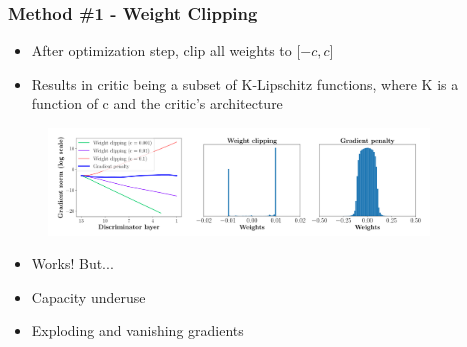 \documentclass{Bredelebeamer}
\begin{document}
\begin{frame}
	\frametitle{Method \#1 - Weight Clipping}
	\begin{itemize}[<+->]
		\item After optimization step, clip all weights to $ \big[{-c}, c \big] $
		\item Results in critic being a subset of K-Lipschitz functions, where K is a function of c and the critic's architecture
	\end{itemize}
	\pause
	\begin{figure}[h!]
		\centering
		\includegraphics[width=0.9\textwidth]{wgan_clipping_vs_norm.png}
	\end{figure}
	\begin{itemize}[<+->]
		\item Works! But...
		\item Capacity underuse
		\item Exploding and vanishing gradients
	\end{itemize}
\end{frame}
\end{document}
